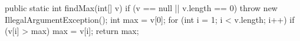 \begin{unipdcode}[language=Java,
  basicstyle=\ttfamily\scriptsize, numbers=none,
  xleftmargin=0.6em, xrightmargin=0.6em,
  framexleftmargin=0.2em]
public static int findMax(int[] v) {
    if (v == null || v.length == 0)
        throw new IllegalArgumentException();
    int max = v[0];
    for (int i = 1; i < v.length; i++)
        if (v[i] > max) max = v[i];
    return max;
}
\end{unipdcode}
